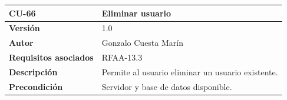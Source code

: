 \documentclass[
]{article}
\begin{document}
\begin{longtable}[]{@{}ll@{}}
\toprule
\begin{minipage}[b]{0.26\columnwidth}\raggedright
\textbf{CU-66}\strut
\end{minipage} & \begin{minipage}[b]{0.68\columnwidth}\raggedright
\textbf{Eliminar usuario}\strut
\end{minipage}\tabularnewline
\midrule
\endhead
\begin{minipage}[t]{0.26\columnwidth}\raggedright
\textbf{Versión}\strut
\end{minipage} & \begin{minipage}[t]{0.68\columnwidth}\raggedright
1.0\strut
\end{minipage}\tabularnewline
\begin{minipage}[t]{0.26\columnwidth}\raggedright
\textbf{Autor}\strut
\end{minipage} & \begin{minipage}[t]{0.68\columnwidth}\raggedright
Gonzalo Cuesta Marín\strut
\end{minipage}\tabularnewline
\begin{minipage}[t]{0.26\columnwidth}\raggedright
\textbf{Requisitos asociados}\strut
\end{minipage} & \begin{minipage}[t]{0.68\columnwidth}\raggedright
RFAA-13.3\strut
\end{minipage}\tabularnewline
\begin{minipage}[t]{0.26\columnwidth}\raggedright
\textbf{Descripción}\strut
\end{minipage} & \begin{minipage}[t]{0.68\columnwidth}\raggedright
Permite al usuario eliminar un usuario existente.\strut
\end{minipage}\tabularnewline
\begin{minipage}[t]{0.26\columnwidth}\raggedright
\textbf{Precondición}\strut
\end{minipage} & \begin{minipage}[t]{0.68\columnwidth}\raggedright
Servidor y base de datos disponible.


\end{minipage}
\end{longtable}
\end{document}
